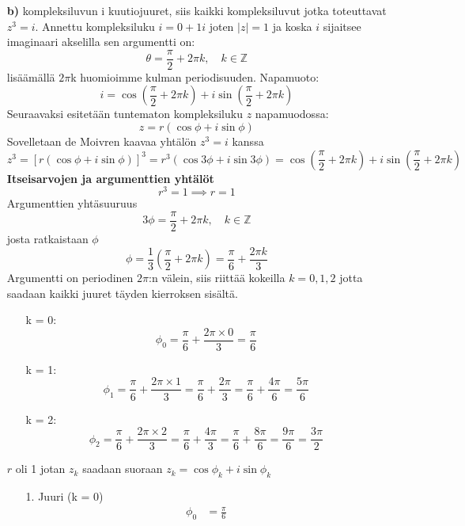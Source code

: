 \documentclass{article}
\begin{document}
\begin{itemize}
    \item[\textbf{b)}]kompleksiluvun i kuutiojuuret, siis kaikki kompleksiluvut jotka toteuttavat $z^3 = i$. \newline
    Annettu kompleksiluku $i = 0 + 1i$ joten $|z| = 1$ ja koska $i$ sijaitsee imaginaari akselilla sen argumentti on:
    \[
    \theta = \frac{\pi}{2} + 2\pi k, \quad k \in \mathbb{Z}
    \]
    lisäämällä $2\pi$k  huomioimme kulman periodisuuden.\newline
    Napamuoto:
    \[
        i = \cos\left( \frac{\pi}{2} + 2\pi k \right) + i \sin\left( \frac{\pi}{2} + 2\pi k \right)
    \]
    Seuraavaksi esitetään tuntematon kompleksiluku $z$ napamuodossa:
    \[
    z = r \left( \cos \phi + i \sin \phi \right)
    \]
    Sovelletaan de Moivren kaavaa yhtälön $z^3 = i$ kanssa
    \[
    z^3 = \left[ r \left( \cos \phi + i \sin \phi \right) \right]^3 = r^3 \left( \cos 3\phi + i \sin 3\phi \right) = \cos\left( \frac{\pi}{2} + 2\pi k \right) + i \sin\left( \frac{\pi}{2} + 2\pi k \right)
    \]
    \textbf{Itseisarvojen ja argumenttien yhtälöt}
    \[
    r^3 = 1 \implies r = 1
    \]
    Argumenttien yhtäsuuruus
    \[
    3\phi = \frac{\pi}{2} + 2\pi k, \quad k \in \mathbb{Z}
    \]
    josta ratkaistaan $\phi$
    \[
    \phi = \frac{1}{3} \left( \frac{\pi}{2} + 2\pi k \right) = \frac{\pi}{6} + \frac{2\pi k}{3}
    \]
    Argumentti on periodinen $2\pi$:n välein, siis riittää kokeilla $k = 0, 1, 2$ jotta saadaan kaikki juuret täyden kierroksen sisältä.
    \begin{itemize}
        \item[k = 0:]
        \[
        \phi_0 = \frac{\pi}{6} + \frac{2\pi \times 0}{3} = \frac{\pi}{6}
        \]
        \item[k = 1:]
        \[
        \phi_1 = \frac{\pi}{6} + \frac{2\pi \times 1}{3} = \frac{\pi}{6} + \frac{2\pi}{3} = \frac{\pi}{6} + \frac{4\pi}{6} = \frac{5\pi}{6}
        \]
        \item[k = 2:]
        \[
        \phi_2 = \frac{\pi}{6} + \frac{2\pi \times 2}{3} = \frac{\pi}{6} + \frac{4\pi}{3} = \frac{\pi}{6} + \frac{8\pi}{6} = \frac{9\pi}{6} = \frac{3\pi}{2}
        \]
    \end{itemize}
\newpage
    $r$ oli 1 jotan $z_k$ saadaan suoraan $z_k = \cos \phi_k + i \sin \phi_k$
    \begin{itemize}
        \item [1.] Juuri (k = 0)
        \[
        \begin{aligned}
            \phi_0 &= \frac{\pi}{6}\\

\end{aligned}\]
\end{itemize}
\end{itemize}
\end{document}
